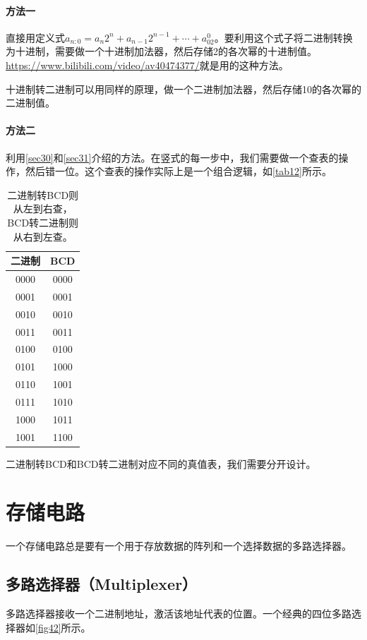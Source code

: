 \paragraph*{方法一} 直接用定义式$a_{n:0}=a_n2^n+a_{n-1}2^{n-1}+\cdots+a_02^0$。要利用这个式子将二进制转换为十进制，需要做一个十进制加法器，然后存储2的各次幂的十进制值。\url{https://www.bilibili.com/video/av40474377/}就是用的这种方法。

十进制转二进制可以用同样的原理，做一个二进制加法器，然后存储10的各次幂的二进制值。

\paragraph*{方法二} 利用\autoref{sec30}和\autoref{sec31}介绍的方法。在竖式的每一步中，我们需要做一个查表的操作，然后错一位。这个查表的操作实际上是一个组合逻辑，如\autoref{tab12}所示。

\begin{table}[!ht]
\centering
\begin{tabular}{|c|c|}
\hline
二进制&BCD\\\hline
0000&0000\\\hline
0001&0001\\\hline
0010&0010\\\hline
0011&0011\\\hline
0100&0100\\\hline
0101&1000\\\hline
0110&1001\\\hline
0111&1010\\\hline
1000&1011\\\hline
1001&1100\\\hline
\end{tabular}
\caption{二进制转BCD则从左到右查，BCD转二进制则从右到左查。}\label{tab12}
\end{table}

二进制转BCD和BCD转二进制对应不同的真值表，我们需要分开设计。

\section{存储电路}
一个存储电路总是要有一个用于存放数据的阵列和一个选择数据的多路选择器。

\subsection{多路选择器（Multiplexer）}
多路选择器接收一个二进制地址，激活该地址代表的位置。一个经典的四位多路选择器如\autoref{fig42}所示。

